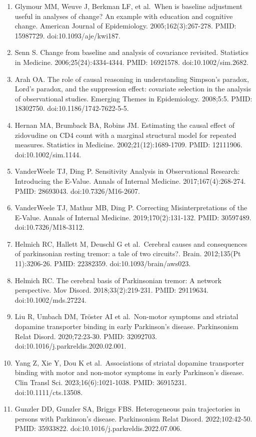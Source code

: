 \documentclass[
  english,
  12pt,
]{article}
\begin{document}
\begin{enumerate}
\item
  Glymour MM, Weuve J, Berkman LF, et al.~When is baseline adjustment useful in analyses of change? An example with education and cognitive change. American Journal of Epidemiology. 2005;162(3):267-278. PMID: 15987729. doi:10.1093/aje/kwi187.
\item
  Senn S. Change from baseline and analysis of covariance revisited. Statistics in Medicine. 2006;25(24):4334-4344. PMID: 16921578. doi:10.1002/sim.2682.
\item
  Arah OA. The role of causal reasoning in understanding Simpson's paradox, Lord's paradox, and the suppression effect: covariate selection in the analysis of observational studies. Emerging Themes in Epidemiology. 2008;5:5. PMID: 18302750. doi:10.1186/1742-7622-5-5.
\item
  Hernan MA, Brumback BA, Robins JM. Estimating the causal effect of zidovudine on CD4 count with a marginal structural model for repeated measures. Statistics in Medicine. 2002;21(12):1689-1709. PMID: 12111906. doi:10.1002/sim.1144.
\item
  VanderWeele TJ, Ding P. Sensitivity Analysis in Observational Research: Introducing the E-Value. Annals of Internal Medicine. 2017;167(4):268-274. PMID: 28693043. doi:10.7326/M16-2607.
\item
  VanderWeele TJ, Mathur MB, Ding P. Correcting Misinterpretations of the E-Value. Annals of Internal Medicine. 2019;170(2):131-132. PMID: 30597489. doi:10.7326/M18-3112.
\item
  Helmich RC, Hallett M, Deuschl G et al.~Cerebral causes and consequences of parkinsonian resting tremor: a tale of two circuits?. Brain. 2012;135(Pt 11):3206-26. PMID: 22382359. doi:10.1093/brain/aws023.
\item
  Helmich RC. The cerebral basis of Parkinsonian tremor: A network perspective. Mov Disord. 2018;33(2):219-231. PMID: 29119634. doi:10.1002/mds.27224.
\item
  Liu R, Umbach DM, Tröster AI et al.~Non-motor symptoms and striatal dopamine transporter binding in early Parkinson's disease. Parkinsonism Relat Disord. 2020;72:23-30. PMID: 32092703. doi:10.1016/j.parkreldis.2020.02.001.
\item
  Yang Z, Xie Y, Dou K et al.~Associations of striatal dopamine transporter binding with motor and non-motor symptoms in early Parkinson's disease. Clin Transl Sci. 2023;16(6):1021-1038. PMID: 36915231. doi:10.1111/cts.13508.
\item
  Gunzler DD, Gunzler SA, Briggs FBS. Heterogeneous pain trajectories in persons with Parkinson's disease. Parkinsonism Relat Disord. 2022;102:42-50. PMID: 35933822. doi:10.1016/j.parkreldis.2022.07.006.

\end{enumerate}
\end{document}

